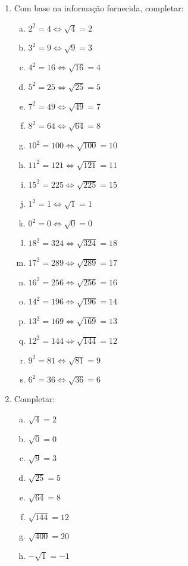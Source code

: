 \documentclass[a4paper,14pt]{article}
\begin{document}
\begin{multicols}{2}
\begin{enumerate}
		\item Com base na informação fornecida, completar:
		\begin{enumerate}[a)]
			\item $2^2 = 4 \Leftrightarrow \sqrt{4} = 2$
			\item $3^2 = 9 \Leftrightarrow \sqrt{9} = 3$
			\item $4^2 = 16 \Leftrightarrow \sqrt{16} = 4$ 
			\item $5^2 = 25 \Leftrightarrow \sqrt{25} = 5$
			\item $7^2 = 49 \Leftrightarrow \sqrt{49} = 7$
			\item $8^2 = 64 \Leftrightarrow \sqrt{64} = 8$
			\item $10^2 = 100 \Leftrightarrow \sqrt{100} = 10$
			\item $11^2 = 121 \Leftrightarrow \sqrt{121} = 11$
			\item $15^2 = 225 \Leftrightarrow \sqrt{225} = 15$
			\item $1^2 = 1 \Leftrightarrow \sqrt{1} = 1$
			\item $0^2 = 0 \Leftrightarrow \sqrt{0} = 0$
			\item $18^2 = 324 \Leftrightarrow \sqrt{324} = 18$
			\item $17^2 = 289 \Leftrightarrow \sqrt{289} = 17$
			\item $16^2 = 256 \Leftrightarrow \sqrt{256} = 16$
			\item $14^2 = 196 \Leftrightarrow \sqrt{196} = 14$
			\item $13^2 = 169 \Leftrightarrow \sqrt{169} = 13$
			\item $12^2 = 144 \Leftrightarrow \sqrt{144} = 12$
			\item $9^2 = 81 \Leftrightarrow \sqrt{81} = 9$
			\item $6^2 = 36 \Leftrightarrow \sqrt{36} = 6$
	    \end{enumerate}
    	\item Completar:
        \begin{enumerate}[a)]
        	\item $\sqrt{4} = 2$
        	\item $\sqrt{0} = 0$
        	\item $\sqrt{9} = 3$
        	\item $\sqrt{25} = 5$
        	\item $\sqrt{64} = 8$
        	\item $\sqrt{144} = 12$
        	\item $\sqrt{400} = 20$
        	\item $-\sqrt{1} = -1$

\end{enumerate}
\end{enumerate}
\end{multicols}
\end{document}
